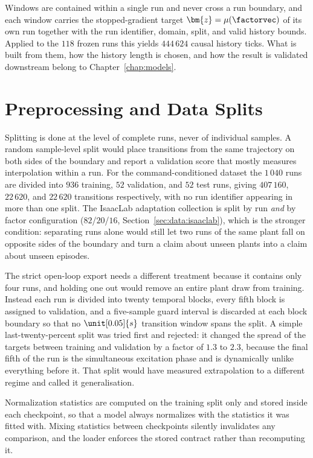 Windows are contained within a single run and never cross a run
boundary, and each window carries the stopped-gradient target
$\bm{z} = \mu(\factorvec)$ of its own run together with the run
identifier, domain, split, and valid history bounds. Applied to the
$118$ frozen runs this yields $444\,624$ causal history ticks. What is
built from them, how the history length is chosen, and how the result is
validated downstream belong to Chapter~\ref{chap:models}.

\section{Preprocessing and Data Splits}
\label{sec:data:preprocessing}

Splitting is done at the level of complete runs, never of individual
samples. A random sample-level split would place transitions from the
same trajectory on both sides of the boundary and report a validation
score that mostly measures interpolation within a run. For the
command-conditioned dataset the $1\,040$ runs are divided into $936$
training, $52$ validation, and $52$ test runs, giving $407\,160$,
$22\,620$, and $22\,620$ transitions respectively, with no run
identifier appearing in more than one split. The IsaacLab adaptation
collection is split by run \emph{and} by factor configuration
($82$/$20$/$16$, Section~\ref{sec:data:isaaclab}), which is the stronger
condition: separating runs alone would still let two runs of the same
plant fall on opposite sides of the boundary and turn a claim about
unseen plants into a claim about unseen episodes.

The strict open-loop export needs a different treatment because it
contains only four runs, and holding one out would remove an entire
plant draw from training. Instead each run is divided into twenty
temporal blocks, every fifth block is assigned to validation, and a
five-sample guard interval is discarded at each block boundary so that
no $\unit[0.05]{s}$ transition window spans the split. A simple
last-twenty-percent split was tried first and rejected: it changed the
spread of the targets between training and validation by a factor of
$1.3$ to $2.3$, because the final fifth of the run is the simultaneous
excitation phase and is dynamically unlike everything before it. That
split would have measured extrapolation to a different regime and called
it generalisation.

Normalization statistics are computed on the training split only and
stored inside each checkpoint, so that a model always normalizes with the
statistics it was fitted with. Mixing statistics between checkpoints
silently invalidates any comparison, and the loader enforces the stored
contract rather than recomputing it.

